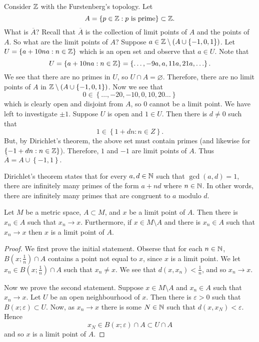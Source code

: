 
\begin{example}[]
	Consider $\mathbb{Z}$ with the Furstenberg's topology.
	Let 
	\[
		A = 
		\left\{ 
			p \in \mathbb{Z}: \text{$p$ is prime}
		\right\}
		\subset \mathbb{Z}.
	\]
	What is $\overline A$?
	Recall that $\overline A$ is the collection of limit points of $A$
	and the points of $A$.
	So what are the limit points of $A$?
	Suppose $a \in \mathbb{Z} \setminus \left( A \cup \left\{ -1,0,1 \right\} \right)$.
	Let $U = \left\{ a + 10na: n \in \mathbb{Z} \right\}$
	which is an open set and observe that $a \in U$.
	Note that
	\[
		U =
		\left\{ a + 10na: n \in \mathbb{Z} \right\} = 
		\left\{ \ldots, -9a, a, 11a, 21a, \ldots \right\}.
	\]
	We see that there are no primes in $U$, so $U \cap A = \varnothing$.
	Therefore, there are no limit points of $A$ in
	$\mathbb{Z} \setminus \left( A \cup \left\{ -1,0,1 \right\} \right)$.
	Now we see that
	\[
		0 \in \left\{ \ldots, -20, -10, 0, 10, 20 \ldots \right\}
	\]
	which is clearly open and disjoint from $A$, so $0$ cannot be a limit point.
	We have left to investigate $\pm 1$.
	Suppose $U$ is open and $1 \in U$.
	Then there is $d \neq 0$ such that
	\[
		1 \in \left\{ 1 + dn: n \in Z \right\}.
	\]
	But, by Dirichlet's theorem, the above set must contain primes
	(and likewise for $ \left\{ -1 + dn: n \in \mathbb{Z} \right\} $).
	Therefore, $1$ and $-1$ are limit points of $A$.
	Thus
	$
		\overline A = A \cup \left\{ -1, 1 \right\}.
	$
\end{example}

Dirichlet's theorem states that for every $a, d \in \mathbb{N}$ such that
$\gcd(a,d) = 1$, there are infinitely many primes of the form $a + nd$
where $n \in \mathbb{N}$.
In other words, there are infinitely many primes that are congruent to $a$
modulo $d$.

\begin{lemma}[]
	Let $M$ be a metric space, $A \subset M$, and $x$ be a limit point of $A$.
	Then there is $x_n \in A$ such that $x_n \to x$.
	Furthermore, if $x \in M \setminus A$ and there is $x_n \in A$ such that
	$x_n \to x$ then $x$ is a limit point of $A$.
\end{lemma}

\begin{proof}
	We first prove the initial statement.
	Obserse that for each $n \in \mathbb{N}$, $B\left( x; \frac1n \right) \cap A$ 
	contains a point not equal to $x$, since $x$ is a limit point.
	We let $x_n \in B(x; \frac1n) \cap A$ such that $x_n \neq x$.
	We see that $d(x,x_n) < \frac1n$, and so $x_n \to x$.

	Now we prove the second statement.
	Suppose $x \in M \setminus A$ and $x_n \in A$ such that $x_n \to x$.
	Let $U$ be an open neighbourhood of $x$.
	Then there is $\varepsilon > 0$ such that $B(x; \varepsilon) \subset U$.
	Now, as $x_n \to x$ there is some $N \in \mathbb{N}$ such that 
	$d(x,x_N) < \varepsilon$.
	Hence
	\[
		x_N \in B(x; \varepsilon) \cap A \subset U \cap A
	\]
	and so $x$ is a limit point of $A$.
\end{proof}

